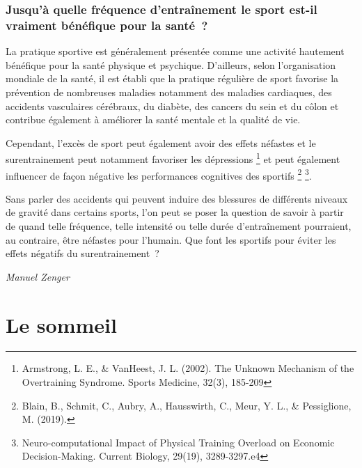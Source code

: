 \documentclass[
  10pt,
  french,
  a5paper,
  openany]{book}
\newenvironment{signature}{\begin{flushright}}{\end{flushright}}
\begin{document}
\hypertarget{jusquuxe0-quelle-fruxe9quence-dentrauxeenement-le-sport-est-il-vraiment-buxe9nuxe9fique-pour-la-santuxe9}{%
\subsection*{Jusqu'à quelle fréquence d'entraînement le sport est-il vraiment bénéfique pour la santé~?}\label{jusquuxe0-quelle-fruxe9quence-dentrauxeenement-le-sport-est-il-vraiment-buxe9nuxe9fique-pour-la-santuxe9}}

La pratique sportive est généralement présentée comme une activité hautement bénéfique pour la santé physique et psychique. D'ailleurs, selon l'organisation mondiale de la santé, il est établi que la pratique régulière de sport favorise la prévention de nombreuses maladies notamment des maladies cardiaques, des accidents vasculaires cérébraux, du diabète, des cancers du sein et du côlon et contribue également à améliorer la santé mentale et la qualité de vie.

Cependant, l'excès de sport peut également avoir des effets néfastes et le surentrainement peut notamment favoriser les dépressions \footnote{Armstrong, L. E., \& VanHeest, J. L. (2002). The Unknown Mechanism of the Overtraining Syndrome. Sports Medicine, 32(3), 185-209} et peut également influencer de façon négative les performances cognitives des sportifs \footnote{Blain, B., Schmit, C., Aubry, A., Hausswirth, C., Meur, Y. L., \& Pessiglione, M. (2019).} \footnote{Neuro-computational Impact of Physical Training Overload on Economic Decision-Making. Current Biology, 29(19), 3289-3297.e4}.

Sans parler des accidents qui peuvent induire des blessures de différents niveaux de gravité dans certains sports, l'on peut se poser la question de savoir à partir de quand telle fréquence, telle intensité ou telle durée d'entraînement pourraient, au contraire, être néfastes pour l'humain. Que font les sportifs pour éviter les effets négatifs du surentrainement~?

\begin{signature}
\emph{Manuel Zenger}

\end{signature}

\hypertarget{le-sommeil}{%
\chapter{Le sommeil}\label{le-sommeil}}
\end{document}
